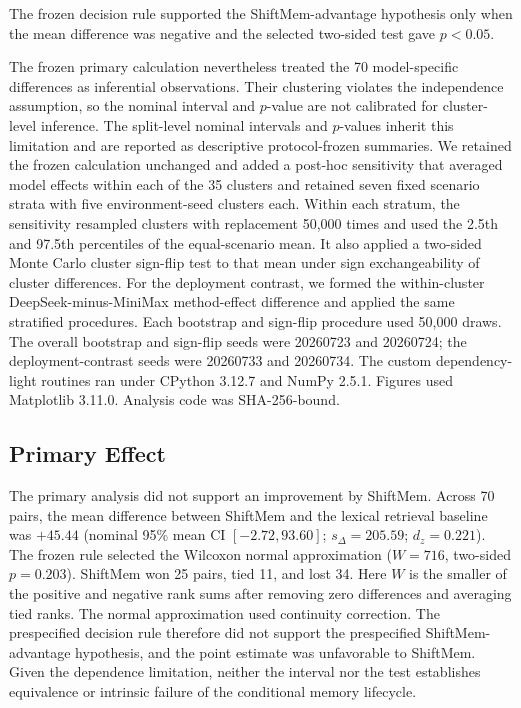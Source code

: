 The frozen decision rule supported the ShiftMem-advantage hypothesis only when
the mean difference was negative and the selected two-sided test gave $p<0.05$.

The frozen primary calculation nevertheless treated the 70 model-specific
differences as inferential observations. Their clustering violates the
independence assumption, so the nominal interval and $p$-value are not calibrated
for cluster-level inference. The split-level nominal intervals and $p$-values
inherit this limitation and are reported as descriptive protocol-frozen
summaries. We retained the frozen calculation unchanged and added a post-hoc
sensitivity that averaged model effects within each of the 35 clusters and
retained seven fixed scenario strata with five environment-seed clusters each.
Within each stratum, the sensitivity resampled clusters with replacement 50,000
times and used the 2.5th and 97.5th percentiles of the equal-scenario mean. It
also applied a two-sided Monte Carlo cluster sign-flip test to that mean under
sign exchangeability of cluster differences. For the deployment contrast, we
formed the within-cluster DeepSeek-minus-MiniMax method-effect difference and
applied the same stratified procedures. Each bootstrap and sign-flip procedure
used 50,000 draws. The overall bootstrap and sign-flip seeds were 20260723 and
20260724; the deployment-contrast seeds were 20260733 and 20260734. The custom
dependency-light routines ran under CPython 3.12.7 and NumPy 2.5.1. Figures used
Matplotlib 3.11.0. Analysis code was SHA-256-bound.

\subsection{Primary Effect}
\label{sec:primary-result}

The primary analysis did not support an improvement by ShiftMem. Across 70
pairs, the mean difference between ShiftMem and the lexical retrieval baseline
was $+45.44$ (nominal 95\% mean CI
$[-2.72,93.60]$; $s_\Delta=205.59$; $d_z=0.221$). The frozen rule selected the
Wilcoxon normal approximation ($W=716$, two-sided $p=0.203$). ShiftMem won 25
pairs, tied 11, and lost 34. Here $W$ is the smaller of the positive and
negative rank sums after removing zero differences and averaging tied ranks.
The normal approximation used continuity correction. The prespecified decision
rule therefore did not support the prespecified ShiftMem-advantage hypothesis,
and the point estimate was unfavorable to ShiftMem. Given the dependence
limitation, neither the interval nor the test establishes equivalence or
intrinsic failure of the conditional memory lifecycle.

